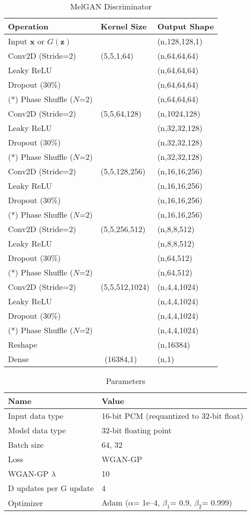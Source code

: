 \begin{table}[H]
\caption{MelGAN Discriminator}\label{melgan_disc}
\centering
\begin{tabular}{l|l|l}
Operation & Kernel Size & Output Shape \\ \hline
Input $\boldsymbol{x}$ or $G(\boldsymbol z)$ & \  & (n,128,128,1)\\
Conv2D (Stride=2) & (5,5,1,64) & (n,64,64,64)\\
Leaky ReLU & \ & (n,64,64,64) \\
Dropout (30\%) & \ & (n,64,64,64)\\
(*) Phase Shuffle ($N$=2) & \ & (n,64,64,64)\\
Conv2D (Stride=2) & (5,5,64,128) & (n,1024,128)\\
Leaky ReLU & \ & (n,32,32,128) \\
Dropout (30\%) & \ & (n,32,32,128)\\
(*) Phase Shuffle ($N$=2) & \ & (n,32,32,128)\\
Conv2D (Stride=2) & (5,5,128,256) & (n,16,16,256)\\
Leaky ReLU & \ & (n,16,16,256) \\
Dropout (30\%) & \ & (n,16,16,256)\\
(*) Phase Shuffle ($N$=2) & \ & (n,16,16,256)\\
Conv2D (Stride=2) & (5,5,256,512) & (n,8,8,512)\\
Leaky ReLU & \ & (n,8,8,512) \\
Dropout (30\%) & \ & (n,64,512)\\
(*) Phase Shuffle ($N$=2) & \ & (n,64,512)\\
Conv2D (Stride=2) & (5,5,512,1024) & (n,4,4,1024)\\
Leaky ReLU & \ & (n,4,4,1024) \\
Dropout (30\%) & \ & (n,4,4,1024)\\
(*) Phase Shuffle ($N$=2) & \ & (n,4,4,1024)\\
Reshape &\ & (n,16384)\\
Dense &\ (16384,1) & (n,1)
\end{tabular}
\end{table}

\begin{table}[H]
\caption{Parameters}\label{param_table}
\centering
\begin{tabular}{l|l}
Name & Value \\ \hline
Input data type & 16-bit PCM (requantized to 32-bit float)\\
Model data type & 32-bit floating point\\
Batch size & 64, 32\\
Loss & WGAN-GP \cite{gulrajani2017improved}\\
WGAN-GP $\lambda$ & 10\\
D updates per G update & 4\\
Optimizer & Adam ($\alpha$= 1e--4, $\beta_1$= 0.9, $\beta_2$= 0.999)
\end{tabular}
\end{table}